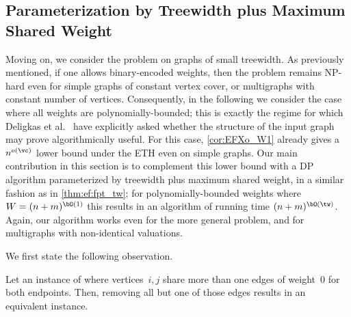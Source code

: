 \documentclass[11pt,letterpaper]{article}
\begin{document}



\subsection{Parameterization by Treewidth plus Maximum Shared Weight}\label{subsec:EFXo:tw}

Moving on, we consider the {\EFXo} problem on graphs of small treewidth.
As previously mentioned, if one allows binary-encoded weights, then the problem remains
NP-hard even for simple graphs of constant vertex cover, or multigraphs with constant number
of vertices. Consequently, in the following we consider the case where all weights are polynomially-bounded;
this is exactly the regime for which Deligkas et al.~\cite{ijcai/DeligkasEGK25} have explicitly asked whether
the structure of the input graph may prove algorithmically useful.
For this case, \cref{cor:EFXo_W1} already gives a $n^{o(\vc)}$ lower bound under the ETH even on
simple graphs. Our main contribution in this section is to complement this lower bound with a DP algorithm parameterized by treewidth
plus maximum shared weight, in a similar fashion as in \cref{thm:ef:fpt_tw};
for polynomially-bounded weights where $W = (n+m)^{\bO(1)}$ this results in an algorithm of running time $(n+m)^{\bO(\tw)}$.
Again, our algorithm works even for the more general {\EFXmc} problem, and for multigraphs with non-identical valuations.

We first state the following observation.

\begin{observation}\label{obs:efx_zero_value_goods}
    Let an instance of {\EFXo} where vertices~$i,j$ share more than one edges of weight~$0$ for both endpoints.
    Then, removing all but one of those edges results in an equivalent instance.
\end{observation}
\end{document}
